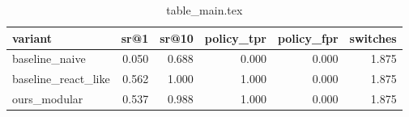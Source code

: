 \begin{table}
\centering
\begin{tabular}{lrrrrr}
\hline
variant & sr@1 & sr@10 & policy_tpr & policy_fpr & switches \\
\hline
baseline_naive & 0.050 & 0.688 & 0.000 & 0.000 & 1.875 \\
baseline_react_like & 0.562 & 1.000 & 1.000 & 0.000 & 1.875 \\
ours_modular & 0.537 & 0.988 & 1.000 & 0.000 & 1.875 \\
\hline
\end{tabular}
\caption{table_main.tex}
\end{table}
